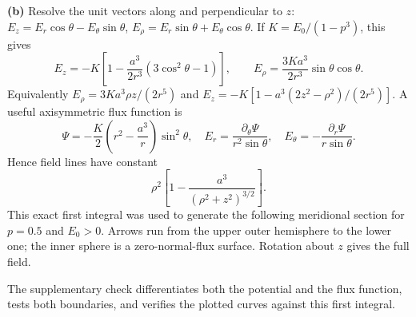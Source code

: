 \textbf{(b)} Resolve the unit vectors along and perpendicular to
$z$: $E_z=E_r\cos\theta-E_\theta\sin\theta$,
$E_\rho=E_r\sin\theta+E_\theta\cos\theta$.  If
$K=E_0/(1-p^3)$, this gives
\[
\boxed{E_z=-K\left[1-\frac{a^3}{2r^3}(3\cos^2\theta-1)\right],
\qquad E_\rho=\frac{3Ka^3}{2r^3}\sin\theta\cos\theta.}
\]
Equivalently $E_\rho=3Ka^3\rho z/(2r^5)$ and
$E_z=-K[1-a^3(2z^2-\rho^2)/(2r^5)]$.
A useful axisymmetric flux function is
\[
\Psi=-\frac K2\left(r^2-\frac{a^3}{r}\right)\sin^2\theta,
\quad
E_r=\frac{\partial_\theta\Psi}{r^2\sin\theta},\quad
E_\theta=-\frac{\partial_r\Psi}{r\sin\theta}.
\]
Hence field lines have constant
\[
\boxed{\rho^2\left[1-\frac{a^3}{(\rho^2+z^2)^{3/2}}\right].}
\]
This exact first integral was used to generate the following
meridional section for $p=0.5$ and $E_0>0$.  Arrows run from the
upper outer hemisphere to the lower one; the inner sphere is a
zero-normal-flux surface.  Rotation about $z$ gives the full field.
\begin{center}

\end{center}
The supplementary check differentiates both the potential and the
flux function, tests both boundaries, and verifies the plotted
curves against this first integral.


